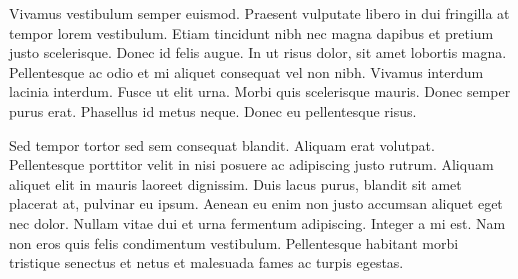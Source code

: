 Vivamus vestibulum semper euismod. Praesent vulputate libero in dui fringilla at tempor lorem vestibulum. Etiam tincidunt nibh nec magna dapibus et pretium justo scelerisque. Donec id felis augue. In ut risus dolor, sit amet lobortis magna. Pellentesque ac odio et mi aliquet consequat vel non nibh. Vivamus interdum lacinia interdum. Fusce ut elit urna. Morbi quis scelerisque mauris. Donec semper purus erat. Phasellus id metus neque. Donec eu pellentesque risus.

Sed tempor tortor sed sem consequat blandit. Aliquam erat volutpat. Pellentesque porttitor velit in nisi posuere ac adipiscing justo rutrum. Aliquam aliquet elit in mauris laoreet dignissim. Duis lacus purus, blandit sit amet placerat at, pulvinar eu ipsum. Aenean eu enim non justo accumsan aliquet eget nec dolor. Nullam vitae dui et urna fermentum adipiscing. Integer a mi est. Nam non eros quis felis condimentum vestibulum. Pellentesque habitant morbi tristique senectus et netus et malesuada fames ac turpis egestas.


